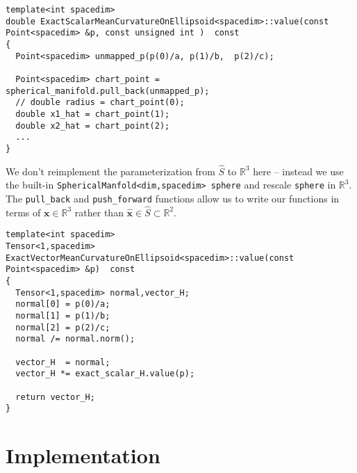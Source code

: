 \documentclass[10pt]{article}
\newcommand{\R}{\mathbb{R}}
\newcommand{\mbf}[1]{\boldsymbol{#1}}
\begin{document}
\begin{verbatim}
template<int spacedim>
double ExactScalarMeanCurvatureOnEllipsoid<spacedim>::value(const Point<spacedim> &p, const unsigned int )  const
{
  Point<spacedim> unmapped_p(p(0)/a, p(1)/b,  p(2)/c);

  Point<spacedim> chart_point = spherical_manifold.pull_back(unmapped_p);
  // double radius = chart_point(0); 
  double x1_hat = chart_point(1);
  double x2_hat = chart_point(2);
  ...  
}
\end{verbatim}


We don't reimplement the parameterization from $\hat{S}$ to $\R^3$ here -- instead we
use the built-in \texttt{SphericalManfold<dim,spacedim> sphere} and rescale
\texttt{sphere} in $\R^3$.  The
\texttt{pull\_back} and \texttt{push\_forward} functions allow us to write our
functions in terms of $\mbf{x} \in \R^3$ rather than $\hat{\mbf{x}} \in \hat{S}
\subset \R^2$. 

\begin{verbatim}
template<int spacedim>
Tensor<1,spacedim> ExactVectorMeanCurvatureOnEllipsoid<spacedim>::value(const Point<spacedim> &p)  const
{
  Tensor<1,spacedim> normal,vector_H;
  normal[0] = p(0)/a;
  normal[1] = p(1)/b;
  normal[2] = p(2)/c;
  normal /= normal.norm();

  vector_H  = normal;
  vector_H *= exact_scalar_H.value(p);

  return vector_H;
}
\end{verbatim}

\section*{Implementation}
\end{document}
